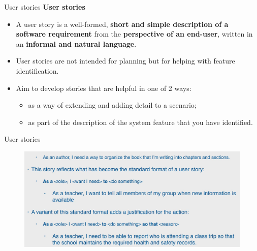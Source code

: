 \documentclass{beamer}
\begin{document}
\begin{frame}{User stories}
		\textbf{User stories}
	\begin{itemize}
		\item A user story is a well-formed, \textbf{short and simple description of a software requirement} from the \textbf{perspective of an end-user}, written in an \textbf{informal and natural language}. 
		\item User stories are not intended for planning but for helping with feature 
		identification. 
		\item Aim to develop stories that are helpful in one of 2 ways:
		\begin{itemize}
			\item as a way of extending and adding detail to a scenario; 
			\item as part of the description of the system feature that you have identified.
		\end{itemize}
	\end{itemize}
\end{frame}

\begin{frame}{User stories}
	\begin{figure}
	\includegraphics[scale=.35]{img/m2_43.jpg}
\end{figure}
\end{frame}
\end{document}
